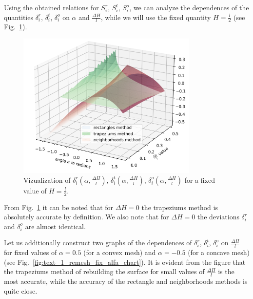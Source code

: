 \documentclass[
11pt,%
tightenlines,%
twoside,%
onecolumn,%
nofloats,%
nobibnotes,%
nofootinbib,%
superscriptaddress,%
noshowpacs,%
centertags]%
{revtex4}
\begin{document}
Using the obtained relations for $S_i^r$, $S_i^t$, $S_i^o$, we can analyze the dependences of the quantities $\delta_i^r$, $\delta_i^t$, $\delta_i^o$ on $\alpha$ and $\frac{\Delta H}{l}$, while we will use the fixed quantity $H = \frac{l}{2}$ (see Fig.~\ref{fig:text_1_remesh_3d_main_chart}).

\begin{figure}[ht]
\setcaptionmargin{5mm}
\onelinecaptionstrue  %
\includegraphics[width=0.8\textwidth]{pics/remesh_3d_chart.png}
\caption{Vizualization of $\delta_i^r(\alpha, \frac{\Delta H}{l})$, $\delta_i^t(\alpha, \frac{\Delta H}{l})$, $\delta_i^o(\alpha, \frac{\Delta H}{l})$ for a fixed value of $H = \frac{l}{2}$.}
\label{fig:text_1_remesh_3d_main_chart}
\end{figure}

From Fig.~\ref{fig:text_1_remesh_3d_main_chart} it can be noted that for $\Delta H = 0$ the trapeziums method is absolutely accurate by definition.
We also note that for $\Delta H = 0$ the deviations $\delta_i^r$ and $\delta_i^o$ are almost identical.

Let us additionally construct two graphs of the dependences of $\delta_i^r$, $\delta_i^t$, $\delta_i^o$ on $\frac{\Delta H}{l}$ for fixed values of $\alpha = 0.5$ (for a convex mesh) and $\alpha = -0.5$ (for a concave mesh) (see Fig.~\ref{fig:text_1_remesh_fix_alfa_chart}).
It is evident from the figure that the trapeziums method of rebuilding the surface for small values of $\frac{\Delta H}{l}$ is the most accurate, while the accuracy of the rectangle and neighborhoods methods is quite close.
\end{document}
